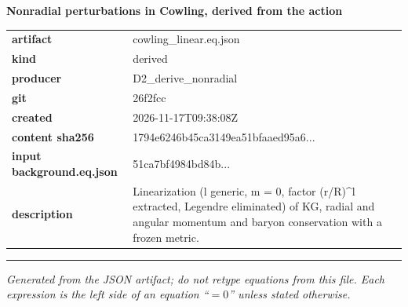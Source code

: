 \documentclass[10pt,a4paper]{article}
\begin{document}
{\Large\bfseries Nonradial perturbations in Cowling, derived from the action}\par
\smallskip
\begin{tabular}{@{}lp{}@{}}\textbf{artifact} & cowling\_linear.eq.json\\\textbf{kind} & derived\\\textbf{producer} & D2\_derive\_nonradial\\\textbf{git} & 26f2fcc\\\textbf{created} & 2026-11-17T09:38:08Z\\\textbf{content sha256} & 1794e6246b45ca3149ea51bfaaed95a6...\\\textbf{input background.eq.json} & 51ca7bf4984bd84b...\\\textbf{description} & Linearization (l generic, m = 0, factor (r/R)\textasciicircum{}l extracted, Legendre eliminated) of KG, radial and angular momentum and baryon conservation with a frozen metric.\\\end{tabular}
\par\medskip\hrule\medskip

\textit{Generated from the JSON artifact; do not retype equations from this file. Each expression is the left side of an equation ``$= 0$'' unless stated otherwise.}\par
\end{document}
